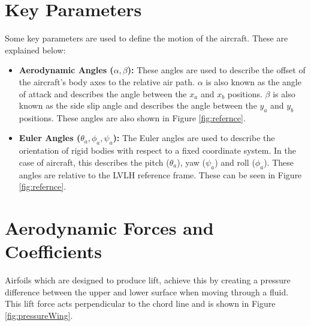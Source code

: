 \section{Key Parameters}
\label{subsubsec:keyparam}
Some key parameters are used to define the motion of the aircraft. These are explained below: 
\begin{itemize}
    \item \textbf{Aerodynamic Angles ($\alpha, \beta$):} These angles are used to describe the offset of the aircraft's body axes to the relative air path. $\alpha$ is also known as the angle of attack and describes the angle between the $x_a$ and $x_b$ positions. $\beta$ is also known as the side slip angle and describes the angle between the $y_a$ and $y_b$ positions. These angles are also shown in Figure \ref{fig:refernce}.
    \item \textbf{Euler Angles ($\theta_a, \phi_a, \psi_a $):} The Euler angles are used to describe the orientation of rigid bodies with respect to a fixed coordinate system. In the case of aircraft, this describes the pitch ($\theta_a$), yaw ($\psi_a$) and roll ($\phi_a$). These angles are relative to the LVLH reference frame. These can be seen in Figure \ref{fig:refernce}.
\end{itemize}

\section{Aerodynamic Forces and Coefficients}
Airfoils which are designed to produce lift, achieve this by creating a  pressure difference between the upper and lower surface when moving through a fluid. This lift force acts perpendicular to the chord line and is shown in Figure \ref{fig:pressureWing}.



